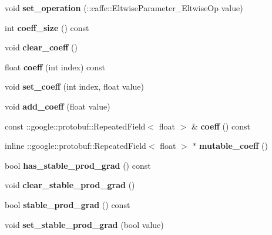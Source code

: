 \begin{DoxyCompactItemize}
\item 
\mbox{\label{classcaffe_1_1_eltwise_parameter_a608a2e0f965649f327426cb2a46923d9}} 
void {\bfseries set\+\_\+operation} (\+::caffe\+::\+Eltwise\+Parameter\+\_\+\+Eltwise\+Op value)
\item 
\mbox{\label{classcaffe_1_1_eltwise_parameter_a6864981a3d5f528cb13ae00b25bae3a9}} 
int {\bfseries coeff\+\_\+size} () const
\item 
\mbox{\label{classcaffe_1_1_eltwise_parameter_a43790b180f32abe526e71744d5aea96f}} 
void {\bfseries clear\+\_\+coeff} ()
\item 
\mbox{\label{classcaffe_1_1_eltwise_parameter_aa8e653930b71babc4da53b1b928a9965}} 
float {\bfseries coeff} (int index) const
\item 
\mbox{\label{classcaffe_1_1_eltwise_parameter_ae3138a9c622f4fcf3b2bae10cd82fec2}} 
void {\bfseries set\+\_\+coeff} (int index, float value)
\item 
\mbox{\label{classcaffe_1_1_eltwise_parameter_a2a9af9bb71f3037936217ed5c360ebc3}} 
void {\bfseries add\+\_\+coeff} (float value)
\item 
\mbox{\label{classcaffe_1_1_eltwise_parameter_aa85c907e4f2837557d5b0a7f8adba1f7}} 
const \+::google\+::protobuf\+::\+Repeated\+Field$<$ float $>$ \& {\bfseries coeff} () const
\item 
\mbox{\label{classcaffe_1_1_eltwise_parameter_a1bbb509cf2da8a38a11e12f752b6a8e7}} 
inline \+::google\+::protobuf\+::\+Repeated\+Field$<$ float $>$ $\ast$ {\bfseries mutable\+\_\+coeff} ()
\item 
\mbox{\label{classcaffe_1_1_eltwise_parameter_abace0ef7da67158c866f6f8589d9674d}} 
bool {\bfseries has\+\_\+stable\+\_\+prod\+\_\+grad} () const
\item 
\mbox{\label{classcaffe_1_1_eltwise_parameter_abafdba670525d20ce2108083da7cecac}} 
void {\bfseries clear\+\_\+stable\+\_\+prod\+\_\+grad} ()
\item 
\mbox{\label{classcaffe_1_1_eltwise_parameter_a64e041c34d899d4cecd0b3db34dc2c98}} 
bool {\bfseries stable\+\_\+prod\+\_\+grad} () const
\item 
\mbox{\label{classcaffe_1_1_eltwise_parameter_a400f96405dfce6e32f8e26659007f04d}} 
void {\bfseries set\+\_\+stable\+\_\+prod\+\_\+grad} (bool value)
\end{DoxyCompactItemize}

